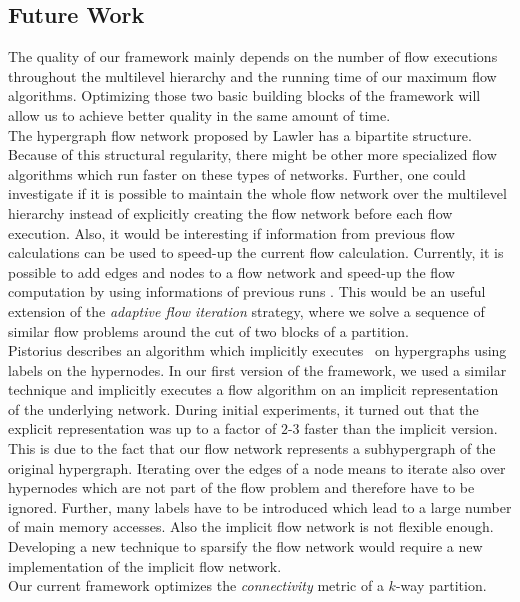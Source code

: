 \subsection{Future Work}

The quality of our framework mainly depends on the number of flow executions
throughout the multilevel hierarchy and the running time of our maximum flow algorithms.
Optimizing those two basic building blocks of the framework will allow us to achieve 
better quality in the same amount of time.\\
The hypergraph flow network proposed by Lawler \cite{lawler1973} has a bipartite 
structure. Because of this structural regularity, there might be other more specialized
flow algorithms which run faster on these types of networks. Further,
one could investigate if it is possible to maintain the whole flow network over the
multilevel hierarchy instead of explicitly creating the flow network before each flow
execution. Also, it would be interesting if information from previous flow calculations can 
be used to speed-up the current flow calculation. Currently, it is possible to add edges and nodes to a flow network and speed-up
the flow computation by using informations of previous runs \cite{goldberg2015faster}. This 
would be an useful extension of the \emph{adaptive flow iteration} strategy, where we solve
a sequence of similar flow problems around the cut of two blocks of a partition. \\
Pistorius \cite{pistorius2003} describes an algorithm which implicitly 
executes \EdmondKarp~on hypergraphs using labels on the hypernodes. 
In our first version of the framework, we used a similar 
technique and implicitly executes a flow algorithm on an implicit representation of 
the underlying network. During initial experiments, it turned out that the explicit representation
was up to a factor of $2$-$3$ faster than the implicit version. 
This is due to the fact that our flow network represents a subhypergraph of the 
original hypergraph. Iterating over the edges of a node means to iterate also 
over hypernodes which are not part of the flow problem and therefore have to be ignored.
Further, many labels have to be introduced which lead to a large number of 
main memory accesses. Also the implicit flow network is not flexible enough. Developing a new 
technique to sparsify the flow network would require a new implementation of 
the implicit flow network.\\
Our current framework optimizes the \emph{connectivity} metric of a $k$-way partition.
